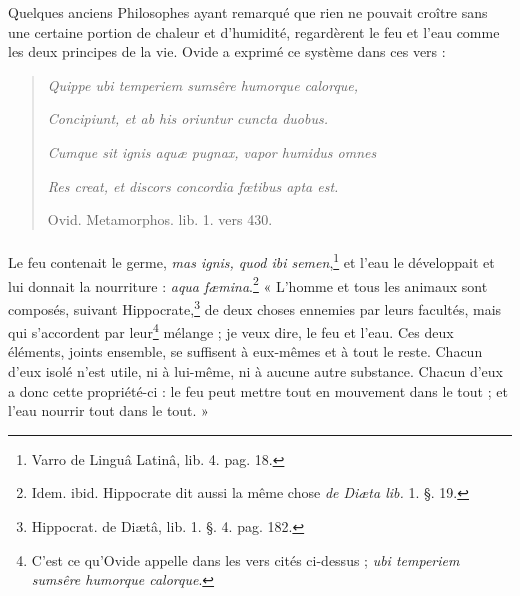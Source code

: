 \documentclass[a4paper, 18pt, oneside]{article}
\begin{document}
Quelques anciens Philosophes ayant remarqué que rien ne pouvait croître sans une certaine portion de chaleur et d'humidité, regardèrent le feu et l'eau comme les deux principes de la vie. Ovide a exprimé ce système dans ces vers :
\begin{quotation}
\emph{Quippe ubi temperiem sumsêre humorque calorque,}

\emph{Concipiunt, et ab his oriuntur cuncta duobus.}

\emph{Cumque sit ignis aquæ pugnax, vapor humidus omnes}

\emph{Res creat, et discors concordia fœtibus apta est.}

\hspace*{30mm}Ovid. Metamorphos. lib. 1. vers 430.
\end{quotation}
\paragraph{}
Le feu contenait le germe, \emph{mas ignis, quod ibi semen},\footnote{Varro de Linguâ Latinâ, lib. 4. pag. 18.} et l'eau le développait et lui donnait la nourriture : \emph{aqua fæmina}.\footnote{Idem. ibid. Hippocrate dit aussi la même chose \emph{de Diæta lib.} 1. §. 19.} « L'homme et tous les animaux sont composés, suivant Hippocrate,\footnote{Hippocrat. de Diætâ, lib. 1. §. 4. pag. 182.} de deux choses ennemies par leurs facultés, mais qui s'accordent par leur\footnote{C'est ce qu'Ovide appelle dans les vers cités ci-dessus ; \emph{ubi temperiem sumsêre humorque calorque}.} mélange ; je veux dire, le feu et l'eau. Ces deux éléments, joints ensemble, se suffisent à eux-mêmes et à tout le reste. Chacun d'eux isolé n'est utile, ni à lui-même, ni à aucune autre substance. Chacun d'eux a donc cette propriété-ci : le feu peut mettre tout en mouvement dans le tout ; et l'eau nourrir tout dans le tout. »
\end{document}
